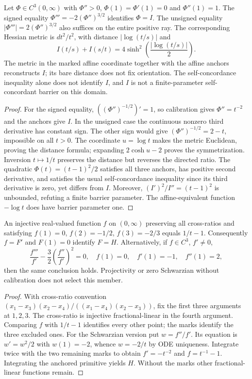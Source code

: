 \begin{theorem}
\label{final:C6}
Let $\Phi\in C^3(0,\infty)$ with $\Phi''>0$,
$\Phi(1)=\Phi'(1)=0$ and $\Phi''(1)=1$. The signed equality
$\Phi'''=-2(\Phi'')^{3/2}$ identifies $\Phi=I$.
The unsigned equality $|\Phi'''|=2(\Phi'')^{3/2}$ also suffices
on the entire positive ray. The corresponding Hessian metric is
$dt^2/t^2$, with distance $|\log(t/s)|$ and
\[
 I(t/s)+I(s/t)=4\sinh^2\!\left(\frac{|\log(t/s)|}{2}\right).
\]
The metric in the marked affine coordinate together with the affine
anchors reconstructs $I$; its bare distance does not fix orientation.
The self-concordance inequality alone does not identify $I$, and
$I$ is not a finite-parameter self-concordant barrier on this domain.
\end{theorem}
\begin{proof}
For the signed equality, $((\Phi'')^{-1/2})'=1$, so calibration gives
$\Phi''=t^{-2}$ and the anchors give $I$. In the unsigned case the
continuous nonzero third derivative has constant sign. The other sign
would give $(\Phi'')^{-1/2}=2-t$, impossible on all $t>0$.
The coordinate $u=\log t$ makes the metric Euclidean, proving the
distance formula; expanding $2\cosh u-2$ proves the symmetrization.
Inversion $t\mapsto1/t$ preserves the distance but reverses the
directed ratio. The quadratic $\Phi(t)=(t-1)^2/2$ satisfies all three
anchors, has positive second derivative, and satisfies the usual
self-concordance inequality since its third derivative is zero,
yet differs from $I$. Moreover,
$(I')^2/I''=(t-1)^2$ is unbounded, refuting a finite barrier parameter.
The affine-equivalent function $-\log t$ does have barrier parameter one.
\end{proof}

\begin{theorem}
\label{final:C7}
An injective real-valued function $f$ on $(0,\infty)$ preserving
all cross-ratios and satisfying
$f(1)=0$, $f(2)=-1/2$, $f(3)=-2/3$ equals $1/t-1$.
Consequently $f=F'$ and $F(1)=0$ identify $F=H$.
Alternatively, if $f\in C^3$, $f'\ne0$,
\[
 \frac{f'''}{f'}-\frac32\left(\frac{f''}{f'}\right)^2=0,
 \quad f(1)=0,\quad f'(1)=-1,\quad f''(1)=2,
\]
then the same conclusion holds. Projectivity or zero Schwarzian
without calibration does not select this member.
\end{theorem}
\begin{proof}
With cross-ratio convention
$(x_1-x_3)(x_2-x_4)/((x_1-x_4)(x_2-x_3))$, fix the first three
arguments at $1,2,3$. The cross-ratio is injective fractional-linear
in the fourth argument. Comparing $f$ with $1/t-1$ identifies every
other point; the marks identify the three excluded ones. For the
Schwarzian version put $w=f''/f'$. Its equation is $w'=w^2/2$ with
$w(1)=-2$, whence $w=-2/t$ by ODE uniqueness. Integrate twice
with the two remaining marks to obtain $f'= -t^{-2}$ and
$f=t^{-1}-1$. Integrating the anchored primitive yields $H$.
Without the marks other fractional-linear functions remain.
\end{proof}

